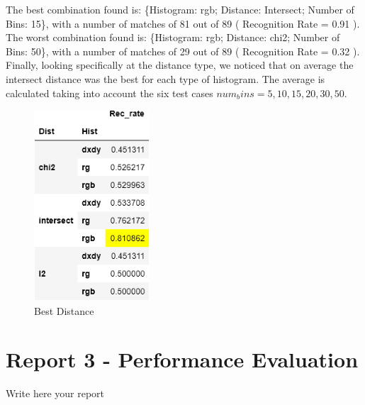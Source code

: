 \documentclass[
	12pt, %
]{fphw}
\begin{document}
The best combination found is: \{Histogram: rgb; Distance: Intersect; Number of Bins: 15\}, with a number of matches of 81 out of 89 ( Recognition Rate = 0.91 ).\\ 

The worst combination found is: \{Histogram: rgb; Distance: chi2; Number of Bins: 50\}, with a number of matches of 29 out of 89 ( Recognition Rate = 0.32 ).\\

Finally, looking specifically at the distance type, we noticed that on average the intersect distance was the best for each type of histogram.
The average is calculated taking into account the six test cases \(num_bins = 5, 10, 15, 20, 30, 50\).

\begin{figure}[h!]
    \centering
    \includegraphics[height=2.8in]{img/best_dist.png}
     \caption{Best Distance}
\end{figure}



\newpage
\section*{Report 3 - Performance Evaluation}

Write here your report






\end{document}
